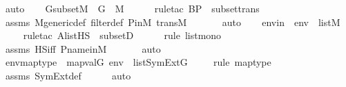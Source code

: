 \begin{isabellebody}
\ auto\isanewline
\isanewline
\ \ \isamarkupfalse%
\ GsubsetM\ {\isacharcolon}{\kern0pt}\ {\isachardoublequoteopen}G\ {\isasymsubseteq}\ M{\isachardoublequoteclose}\ \isanewline
\ \ \ \ \isamarkupfalse%
{\isacharparenleft}{\kern0pt}rule{\isacharunderscore}{\kern0pt}tac\ B{\isacharequal}{\kern0pt}P\ \ subset{\isacharunderscore}{\kern0pt}trans{\isacharparenright}{\kern0pt}\isanewline
\ \ \ \ \isamarkupfalse%
\ assms\ M{\isacharunderscore}{\kern0pt}generic{\isacharunderscore}{\kern0pt}def\ filter{\isacharunderscore}{\kern0pt}def\ P{\isacharunderscore}{\kern0pt}in{\isacharunderscore}{\kern0pt}M\ transM\ \isanewline
\ \ \ \ \isamarkupfalse%
\ auto\isanewline
\isanewline
\ \ \isamarkupfalse%
\ envin\ {\isacharcolon}{\kern0pt}\ {\isachardoublequoteopen}env\ {\isasymin}\ list{\isacharparenleft}{\kern0pt}M{\isacharparenright}{\kern0pt}{\isachardoublequoteclose}\ \isanewline
\ \ \ \ \isamarkupfalse%
{\isacharparenleft}{\kern0pt}rule{\isacharunderscore}{\kern0pt}tac\ A{\isacharequal}{\kern0pt}{\isachardoublequoteopen}list{\isacharparenleft}{\kern0pt}HS{\isacharparenright}{\kern0pt}{\isachardoublequoteclose}\ \ subsetD{\isacharparenright}{\kern0pt}\isanewline
\ \ \ \ \ \isamarkupfalse%
{\isacharparenleft}{\kern0pt}rule\ list{\isacharunderscore}{\kern0pt}mono{\isacharparenright}{\kern0pt}\isanewline
\ \ \ \ \isamarkupfalse%
\ assms{}\ HS{\isacharunderscore}{\kern0pt}iff\ P{\isacharunderscore}{\kern0pt}name{\isacharunderscore}{\kern0pt}in{\isacharunderscore}{\kern0pt}M\ \isanewline
\ \ \ \ \isamarkupfalse%
\ auto\isanewline
\isanewline
\ \ \isamarkupfalse%
\ envmaptype\ {\isacharcolon}{\kern0pt}\ {\isachardoublequoteopen}map{\isacharparenleft}{\kern0pt}val{\isacharparenleft}{\kern0pt}G{\isacharparenright}{\kern0pt}{\isacharcomma}{\kern0pt}\ env{\isacharparenright}{\kern0pt}\ {\isasymin}\ list{\isacharparenleft}{\kern0pt}SymExt{\isacharparenleft}{\kern0pt}G{\isacharparenright}{\kern0pt}{\isacharparenright}{\kern0pt}{\isachardoublequoteclose}\isanewline
\ \ \ \ \isamarkupfalse%
{\isacharparenleft}{\kern0pt}rule\ map{\isacharunderscore}{\kern0pt}type{\isacharparenright}{\kern0pt}\isanewline
\ \ \ \ \isamarkupfalse%
\ assms{}\ SymExt{\isacharunderscore}{\kern0pt}def\isanewline
\ \ \ \ \isamarkupfalse%
\ auto\isanewline
\ \ \ \ \ \ \ \ \ \ \ \ \ \ \ \ \ \ \ \ \ \ \ \ \ \ \ \ \ \ \ \ \ \ \ \ \ \ \ \ \ \ \ \ \ \isanewline

\end{isabellebody}

